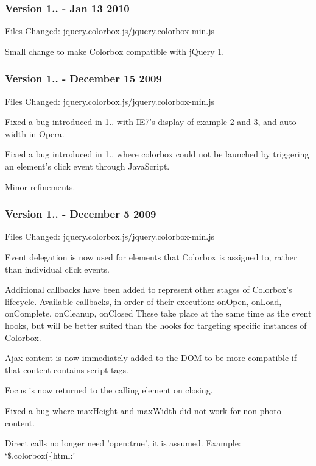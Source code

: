 \subsubsection*{Version 1.. -\/ Jan 13 2010}

Files Changed\-: jquery.\-colorbox.\-js/jquery.colorbox-\/min.\-js


\begin{DoxyItemize}
\item Small change to make Colorbox compatible with j\-Query 1.
\end{DoxyItemize}

\subsubsection*{Version 1.. -\/ December 15 2009}

Files Changed\-: jquery.\-colorbox.\-js/jquery.colorbox-\/min.\-js


\begin{DoxyItemize}
\item Fixed a bug introduced in 1.. with I\-E7's display of example 2 and 3, and auto-\/width in Opera.
\item Fixed a bug introduced in 1.. where colorbox could not be launched by triggering an element's click event through Java\-Script.
\item Minor refinements.
\end{DoxyItemize}

\subsubsection*{Version 1.. -\/ December 5 2009}

Files Changed\-: jquery.\-colorbox.\-js/jquery.colorbox-\/min.\-js


\begin{DoxyItemize}
\item Event delegation is now used for elements that Colorbox is assigned to, rather than individual click events.
\item Additional callbacks have been added to represent other stages of Colorbox's lifecycle. Available callbacks, in order of their execution\-: on\-Open, on\-Load, on\-Complete, on\-Cleanup, on\-Closed These take place at the same time as the event hooks, but will be better suited than the hooks for targeting specific instances of Colorbox.
\item Ajax content is now immediately added to the D\-O\-M to be more compatible if that content contains script tags.
\item Focus is now returned to the calling element on closing.
\item Fixed a bug where max\-Height and max\-Width did not work for non-\/photo content.
\item Direct calls no longer need 'open\-:true', it is assumed. Example\-: `\$.colorbox(\{html\-:'
\end{DoxyItemize}

